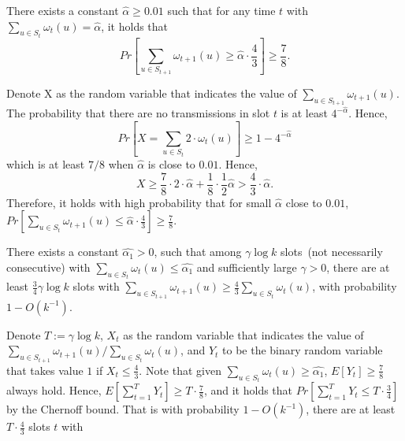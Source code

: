 \begin{lemma}
    \label{lemma10}
    There exists a constant $\hat{\alpha} \geq 0.01$ such that
    for any time $t$ with ${\sum}_{u\in S_t}\omega_t(u)=\hat{\alpha}$,
    it holds that
    \begin{equation}
        Pr[{\sum}_{u\in S_{t+1}}\omega_{t+1}(u) \geq \hat{\alpha}\cdot \frac{4}{3}] \geq \frac{7}{8}.
    \end{equation}
\end{lemma}
\begin{IEEEproof}
    Denote X as the random variable that indicates the value of 
    ${\sum}_{u\in S_{t+1}}\omega_{t+1}(u)$. The probability that 
    there are no transmissions in slot 
    $t$ is at least $4^{-\hat{\alpha}}$. Hence,
    \begin{equation*}
        Pr[X ={\sum}_{u\in S_t}2\cdot\omega_t(u)] 
        \geq 1 - 4^{-\hat{\alpha}}
    \end{equation*}
    which is at least $7/8$ when $\hat{\alpha}$ is close to $0.01$. Hence,
    \begin{equation*}
        X \geq \frac{7}{8}\cdot 2\cdot\hat{\alpha} + 
        \frac{1}{8}\cdot \frac{1}{2}\hat{\alpha} 
        > \frac{4}{3}\cdot\hat{\alpha}.
    \end{equation*}
    Therefore, it holds with high probability that for small $\hat{\alpha}$ close to $0.01$, $Pr[{\sum}_{u\in S_t}\omega_{t+1}(u) 
    \leq \hat{\alpha}\cdot\frac{4}{3}] \geq \frac{7}{8}$.


\end{IEEEproof}


\begin{lemma}
    \label{lemma11}
    There exists a constant $\hat{\alpha_1} > 0$, such that among $\gamma\log k$ 
    slots~(not necessarily consecutive) with ${\sum}_{u\in S_t}\omega_t(u)
    \leq \hat{\alpha_1}$ and sufficiently large $\gamma > 0$, there are at 
    least $\frac{3}{4}\gamma\log k$ slots with ${\sum}_{u\in S_{t+1}}\omega_{t+1}(u)
    \geq \frac{4}{3}{\sum}_{u\in S_t}\omega_t(u)$, with probability $1 - O(k^{-1})$.
\end{lemma}
\begin{IEEEproof}
    Denote $T := \gamma\log k$, $X_t$ as the random variable that indicates the value of 
    ${\sum}_{u\in S_{t+1}}\omega_{t+1}(u) / {\sum}_{u\in S_t}\omega_t(u)$, and 
    $Y_t$ to be the binary random variable that takes value $1$ if $X_t \leq \frac{4}{3}$.
    Note that given ${\sum}_{u\in S_t}\omega_t(u) \geq \hat{\alpha_1}$, $E[Y_t] \geq \frac{7}{8}$
    always hold. Hence, $E[\sum_{t=1}^{T}Y_t] \geq T\cdot\frac{7}{8}$, and it holds that
    $Pr[\sum_{t=1}^{T}Y_t\leq T\cdot\frac{3}{4}]$ by the Chernoff bound. That is with probability 
    $1-O(k^{-1})$, there are at least $T\cdot\frac{4}{3}$ slots $t$ with  
\end{IEEEproof}


